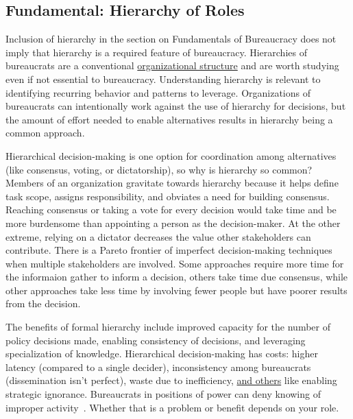 \subsection*{Fundamental: Hierarchy of Roles\label{sec:hierarchy-of-roles}}

Inclusion of hierarchy in the section on Fundamentals of Bureaucracy does not imply that hierarchy is a required feature of bureaucracy. Hierarchies of bureaucrats are a conventional \href{https://en.wikipedia.org/wiki/Organizational_structure}{organizational structure}
%
and are worth studying even if not essential to bureaucracy. Understanding hierarchy is relevant to identifying recurring behavior and patterns to leverage.
Organizations of bureaucrats can intentionally work against the use of hierarchy for decisions, but the amount of effort needed to enable alternatives results in hierarchy being a common approach.


Hierarchical decision-making is one option for coordination among alternatives (like consensus, voting, or dictatorship), so why is hierarchy so common? Members of an organization gravitate towards hierarchy because it helps define task scope, assigns responsibility, and obviates a need for building consensus. Reaching consensus or taking a vote for every decision would take time and be more burdensome than appointing a person as the decision-maker. At the other extreme, relying on a dictator decreases the value other stakeholders can contribute. There is a Pareto frontier of imperfect decision-making techniques when multiple stakeholders are involved. Some approaches require more time for the informaion gather to inform a decision, others take time due consensus, while other approaches take less time by involving fewer people but have poorer results from the decision.


The benefits of formal hierarchy include improved capacity for the number of policy decisions made, enabling consistency of decisions, and leveraging specialization of knowledge. 
Hierarchical decision-making has costs: higher latency (compared to a single decider), inconsistency among bureaucrats (dissemination isn't perfect), waste due to inefficiency,  
\hyperref[sec:unavoidable-hazards]{and others}
%
like enabling strategic ignorance. Bureaucrats in positions of power can deny knowing of improper activity~\cite{2019_McGoey, 2012_McGoey}.  Whether that is a problem or benefit depends on your role. 

